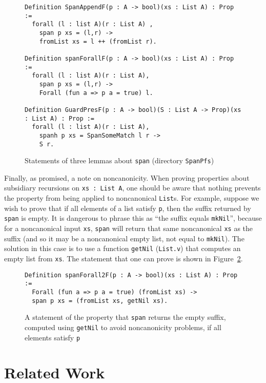 \documentclass[a4paper,USenglish]{lipics-v2021}
\begin{document}
\begin{figure}
\begin{verbatim}
Definition SpanAppendF(p : A -> bool)(xs : List A) : Prop :=
  forall (l : list A)(r : List A) ,
    span p xs = (l,r) ->
    fromList xs = l ++ (fromList r).

Definition spanForallF(p : A -> bool)(xs : List A) : Prop :=
  forall (l : list A)(r : List A),
    span p xs = (l,r) ->
    Forall (fun a => p a = true) l.

Definition GuardPresF(p : A -> bool)(S : List A -> Prop)(xs : List A) : Prop :=
  forall (l : list A)(r : List A),
    spanh p xs = SpanSomeMatch l r ->
    S r.
\end{verbatim}
\caption{Statements of three lemmas about \texttt{span} (directory \texttt{SpanPfs})}
\label{fig:spanlem}
\end{figure}

Finally, as promised, a note on noncanonicity. When proving properties about subsidiary
recursions on \verb|xs : List A|, one should be aware that nothing prevents
the property from being applied to noncanonical \verb|List|s.  For example,
suppose we wish to prove that if all elements of a  list satisfy \verb|p|, then
the suffix returned by \verb|span| is empty.  It is dangerous to phrase
this as ``the suffix equals \verb|mkNil|'', because for a noncanonical input \verb|xs|,
\verb|span| will return that same  noncanonical \verb|xs| as the suffix (and so
it may be a noncanonical empty list, not equal to \verb|mkNil|).  The solution
in this case is to use a function \verb|getNil| (\verb|List.v|) that computes
an empty list from \verb|xs|.  The statement that one can prove is shown in Figure~\ref{fig:spanforallt}.

\begin{figure}
\begin{verbatim}
Definition spanForall2F(p : A -> bool)(xs : List A) : Prop :=
  Forall (fun a => p a = true) (fromList xs) ->
  span p xs = (fromList xs, getNil xs).
\end{verbatim}
\caption{A statement of the property that \texttt{span} returns the empty suffix, computed using \texttt{getNil} to avoid noncanonicity problems, if all elements satisfy \texttt{p}}
\label{fig:spanforallt}
\end{figure}

\section{Related Work}
\label{sec:related}
\end{document}
